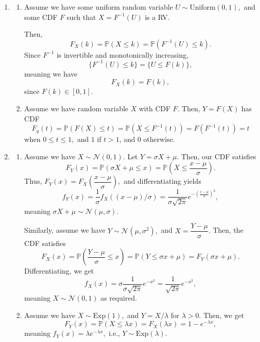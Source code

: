 \documentclass[12pt]{article}
\begin{document}
\begin{enumerate}
  \item
    \begin{enumerate}
      \item Assume we have some uniform random variable $U \sim
        \text{Uniform}(0, 1),$ and some CDF $F$ such that $X =
        F^{-1}(U)$ is a RV.

        Then,
        $$
        F_X(k) = \mathbb P(X \leq k) = \mathbb P(F^{-1}(U) \leq k).
        $$
        Since $F^{-1}$ is invertible and monotonically increasing,
        $$
        \{F^{-1}(U) \leq k\} = \{U \leq F(k)\},
        $$
        meaning we have
        $$
        F_X(k) = F(k),
        $$
        since $F(k) \in [0, 1].$

      \item Assume we have random variable $X$ with CDF $F.$ Then, $Y
        = F(X)$ has CDF
        $$
        F_y(t) = \mathbb P(F(X) \leq t) = \mathbb P(X \leq F^{-1}(t))
        = F(F^{-1}(t)) = t
        $$
        when $0 \leq t \leq 1,$ and $1$ if $t > 1$, and $0$ otherwise.
    \end{enumerate}
  \item
    \begin{enumerate}
      \item Assume we have $X \sim \mathcal N(0, 1).$ Let $Y = \sigma
        X + \mu.$ Then, our CDF satisfies
        $$
        F_Y(x) = \mathbb P(\sigma X+ \mu \leq x) = \mathbb P\left(X
        \leq \dfrac{x-\mu}{\sigma}\right).
        $$
        Thus, $F_Y(x) = F_X\left(\dfrac{x-\mu}{\sigma}\right),$ and
        differentiating yields
        $$
        f_Y(x) = \dfrac{1}{\sigma} f_X((x - \mu)/\sigma) =
        \dfrac{1}{\sigma \sqrt{2\pi}} e^{-\left(\frac{x -
        \mu}{\sigma}\right)^2},
        $$
        meaning $\sigma X + \mu \sim \mathcal N(\mu, \sigma).$

        Similarly, assume we have $Y \sim \mathcal N(\mu, \sigma^2),$
        and $X = \dfrac{Y-\mu}{\sigma}.$ Then, the CDF satisfies
        $$
        F_X(x) = \mathbb P\left(\dfrac{Y-\mu}{\sigma} \leq x\right) =
        \mathbb P(Y \leq \sigma x+ \mu) = F_Y(\sigma x + \mu).
        $$
        Differentiating, we get
        $$
        f_X(x)= \sigma \dfrac{1}{\sigma \sqrt{2\pi}} e^{-x^2} =
        \dfrac{1}{\sqrt{2\pi}} e^{-x^2},
        $$
        meaning $X \sim \mathcal N(0, 1)$ as required.

      \item Assume we have $X \sim \text{Exp}(1),$ and $Y =
        X/\lambda$ for $\lambda > 0.$ Then, we get
        $$
        F_Y(x) = \mathbb P(X \leq \lambda x) = F_X(\lambda x) =
        1-e^{-\lambda x},
        $$
        meaning $f_Y(x) = \lambda e^{-\lambda x},$ i.e., $Y \sim
        \text{Exp}(\lambda).$


\end{enumerate}
\end{enumerate}
\end{document}
